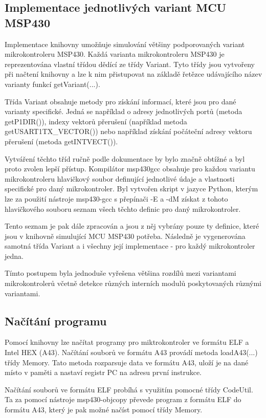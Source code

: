 \subsection{Implementace jednotlivých variant MCU MSP430}

Implementace knihovny umožňuje simulování většiny podporovaných variant mikrokontroleru MSP430. Každá varianta mikrokontroleru MSP430 je reprezentována vlastní třídou dědící ze třídy Variant. Tyto třídy jsou vytvořeny při načtení knihovny a lze k nim přistupovat na základě řetězce udávajícího název varianty funkcí getVariant(...).

Třída Variant obsahuje metody pro získání informací, které jsou pro dané varianty specifické. Jedná se například o adresy jednotlivých portů (metoda getP1DIR()), indexy vektorů přerušení (například metoda getUSART1TX\_VECTOR()) nebo například získání počáteční adresy vektoru přerušení (metoda getINTVECT()).

Vytváření těchto tříd ručně podle dokumentace by bylo značně obtížné a byl proto zvolen lepší přístup. Kompilátor msp430gcc obsahuje pro každou variantu mikrokontroleru hlavičkový soubor definující jednotlivé údaje a vlastnosti specifické pro daný mikrokontroler. Byl vytvořen skript v jazyce Python, kterým lze za použití nástroje msp430-gcc s přepínači -E a -dM získat z tohoto hlavičkového souboru seznam všech těchto definic pro daný mikrokontroler.

Tento seznam je pak dále zpracován a jsou z něj vybrány pouze ty definice, které jsou v knihovně simulující MCU MSP430 potřeba. Následně je vygenerována samotná třída Variant a i všechny její implementace - pro každý mikrokontroler jedna.

Tímto postupem byla jednoduše vyřešena většina rozdílů mezi variantami mikrokontrolerů včetně detekce různých interních modulů poskytovaných různými variantami.

\subsection{Načítání programu}

Pomocí knihovny lze načítat programy pro miktrokontroler ve formátu ELF a Intel HEX (A43). Načítání souborů ve formátu A43 provádí metoda loadA43(...) třídy Memory. Tato metoda rozparsuje data ve formátu A43, uloží je na dané místo v paměti a nastaví registr PC na adresu první instrukce.

Načítání souborů ve formátu ELF probíhá s využitím pomocné třídy CodeUtil. Ta za pomocí nástroje msp430-objcopy převede program z formátu ELF do formátu A43, který je pak možné načíst pomocí třídy Memory.


